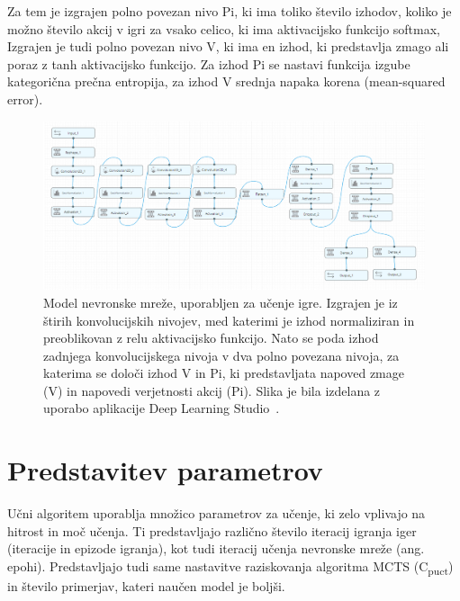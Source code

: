 \documentclass[a4paper, 12pt]{book}
\begin{document}
Za tem je izgrajen polno povezan nivo Pi, ki ima toliko število izhodov, koliko je možno število akcij v igri za vsako celico, ki ima aktivacijsko funkcijo softmax,
Izgrajen je tudi polno povezan nivo V, ki ima en izhod, ki predstavlja zmago ali poraz z tanh aktivacijsko funkcijo.
Za izhod Pi se nastavi funkcija izgube kategorična prečna entropija, za izhod V srednja napaka korena (mean-squared error).

\begin{figure}[h!]
	\begin{center}
		\includegraphics[width=1\textwidth]{photos/model_using_deepcognition.pdf}
	\end{center}
	\caption{Model nevronske mreže, uporabljen za učenje igre. Izgrajen je iz štirih konvolucijskih nivojev, med katerimi je izhod normaliziran in preoblikovan z relu aktivacijsko funkcijo. 
		Nato se poda izhod zadnjega konvolucijskega nivoja v dva polno povezana nivoja, za katerima se določi izhod V in Pi, ki predstavljata napoved zmage (V) in napovedi verjetnosti akcij (Pi).
		Slika je bila izdelana z uporabo aplikacije Deep Learning Studio~\cite{deepcognition}.}
	\label{vizualzacijaModela}
\end{figure}

\section{Predstavitev parametrov}
\label{parametri}
Učni algoritem uporablja množico parametrov za učenje, ki zelo vplivajo na hitrost in moč učenja.
Ti predstavljajo različno število iteracij igranja iger (iteracije in epizode igranja), kot tudi iteracij učenja nevronske mreže (ang. epohi).
Predstavljajo tudi same nastavitve raziskovanja algoritma MCTS (C\textsubscript{puct}) in število primerjav, kateri naučen model je boljši.
\end{document}
